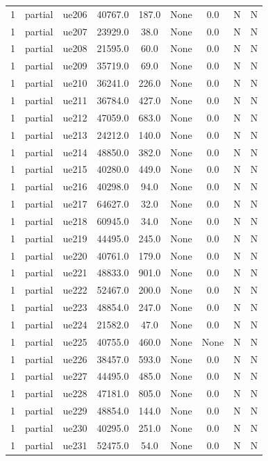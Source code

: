 \begin{table}[ht]
\begin{tabular}{|c|c|c|c|c|c|c|c|c|}
1 & partial & ue206 & 40767.0 & 187.0 & None & 0.0 & N & N \\
1 & partial & ue207 & 23929.0 & 38.0 & None & 0.0 & N & N \\
1 & partial & ue208 & 21595.0 & 60.0 & None & 0.0 & N & N \\
1 & partial & ue209 & 35719.0 & 69.0 & None & 0.0 & N & N \\
1 & partial & ue210 & 36241.0 & 226.0 & None & 0.0 & N & N \\
1 & partial & ue211 & 36784.0 & 427.0 & None & 0.0 & N & N \\
1 & partial & ue212 & 47059.0 & 683.0 & None & 0.0 & N & N \\
1 & partial & ue213 & 24212.0 & 140.0 & None & 0.0 & N & N \\
1 & partial & ue214 & 48850.0 & 382.0 & None & 0.0 & N & N \\
1 & partial & ue215 & 40280.0 & 449.0 & None & 0.0 & N & N \\
1 & partial & ue216 & 40298.0 & 94.0 & None & 0.0 & N & N \\
1 & partial & ue217 & 64627.0 & 32.0 & None & 0.0 & N & N \\
1 & partial & ue218 & 60945.0 & 34.0 & None & 0.0 & N & N \\
1 & partial & ue219 & 44495.0 & 245.0 & None & 0.0 & N & N \\
1 & partial & ue220 & 40761.0 & 179.0 & None & 0.0 & N & N \\
1 & partial & ue221 & 48833.0 & 901.0 & None & 0.0 & N & N \\
1 & partial & ue222 & 52467.0 & 200.0 & None & 0.0 & N & N \\
1 & partial & ue223 & 48854.0 & 247.0 & None & 0.0 & N & N \\
1 & partial & ue224 & 21582.0 & 47.0 & None & 0.0 & N & N \\
1 & partial & ue225 & 40755.0 & 460.0 & None & None & N & N \\
1 & partial & ue226 & 38457.0 & 593.0 & None & 0.0 & N & N \\
1 & partial & ue227 & 44495.0 & 485.0 & None & 0.0 & N & N \\
1 & partial & ue228 & 47181.0 & 805.0 & None & 0.0 & N & N \\
1 & partial & ue229 & 48854.0 & 144.0 & None & 0.0 & N & N \\
1 & partial & ue230 & 40295.0 & 251.0 & None & 0.0 & N & N \\
1 & partial & ue231 & 52475.0 & 54.0 & None & 0.0 & N & N \\

\end{tabular}
\end{table}
